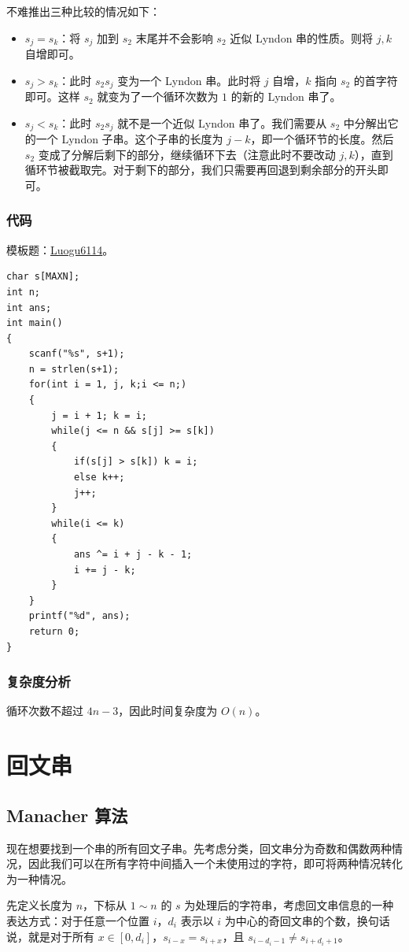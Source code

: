 \documentclass[10pt,twoside,a4paper,UTF8]{ctexbook}
\begin{document}
	不难推出三种比较的情况如下：
	\begin{itemize}
		\item $s_j = s_k$：将 $s_j$ 加到 $s_2$ 末尾并不会影响 $s_2$ 近似 Lyndon 串的性质。则将 $j, k$ 自增即可。
		\item $s_j > s_k$：此时 $s_2s_j$ 变为一个 Lyndon 串。此时将 $j$ 自增，$k$ 指向 $s_2$ 的首字符即可。这样 $s_2$ 就变为了一个循环次数为 $1$ 的新的 Lyndon 串了。
		\item $s_j < s_k$：此时 $s_2s_j$ 就不是一个近似 Lyndon 串了。我们需要从 $s_2$ 中分解出它的一个 Lyndon 子串。这个子串的长度为 $j-k$，即一个循环节的长度。然后 $s_2$ 变成了分解后剩下的部分，继续循环下去（注意此时不要改动 $j, k$），直到循环节被截取完。对于剩下的部分，我们只需要再回退到剩余部分的开头即可。
	\end{itemize}
	
	\subsubsection{代码}
	模板题：\href{https://www.luogu.com.cn/problem/P6114}{Luogu6114}。
	\begin{lstlisting}
char s[MAXN];
int n;
int ans;
int main()
{
	scanf("%s", s+1);
	n = strlen(s+1);
	for(int i = 1, j, k;i <= n;)
	{
		j = i + 1; k = i;
		while(j <= n && s[j] >= s[k])
		{
			if(s[j] > s[k]) k = i;
			else k++;
			j++;
		}
		while(i <= k)
		{
			ans ^= i + j - k - 1;
			i += j - k;
		}
	}
	printf("%d", ans);
	return 0;
}
	\end{lstlisting}
	
	\subsubsection{复杂度分析}
	
	循环次数不超过 $4n-3$，因此时间复杂度为 $O(n)$。
	
	\section{回文串}
	\subsection{Manacher 算法}
	现在想要找到一个串的所有回文子串。先考虑分类，回文串分为奇数和偶数两种情况，因此我们可以在所有字符中间插入一个未使用过的字符，即可将两种情况转化为一种情况。
	
	先定义长度为 $n$，下标从 $1 \sim n$ 的 $s$ 为处理后的字符串，考虑回文串信息的一种表达方式：对于任意一个位置 $i$，$d_i$ 表示以 $i$ 为中心的奇回文串的个数，换句话说，就是对于所有 $x \in [0, d_i]$，$s_{i-x} = s_{i+x}$，且 $s_{i-d_i-1} \not = s_{i+d_i+1}$。
	
\end{document}
